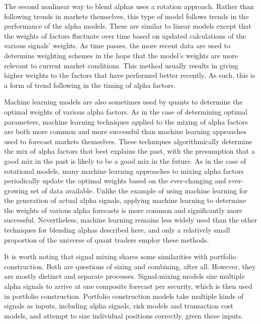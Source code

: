 \documentclass[11pt]{report}
\begin{document}
			The second nonlinear way to blend alphas uses a rotation approach. Rather than following trends in markets themselves, this type of model follows trends in the performance of the alpha models. These are similar to linear models except that the weights of factors fluctuate over time based on updated calculations of the various signals' weights. As time passes, the more recent data are used to determine weighting schemes in the hope that the model's weights are more relevant to current market conditions. This method usually results in giving higher weights to the factors that have performed better recently. As such, this is a form of trend following in the timing of alpha factors.

			Machine learning models are also sometimes used by quants to determine the optimal weights of various alpha factors. As in the case of determining optimal parameters, machine learning techniques applied to the mixing of alpha factors are both more common and more successful than machine learning approaches used to forecast markets themselves. These techniques algorithmically determine the mix of alpha factors that best explains the past, with the presumption that a good mix in the past is likely to be a good mix in the future. As in the case of rotational models, many machine learning approaches to mixing alpha factors periodically update the optimal weights based on the ever-changing and ever-growing set of data available. Unlike the example of using machine learning for the generation of actual alpha signals, applying machine learning to determine the weights of various alpha forecasts is more common and significantly more successful. Nevertheless, machine learning remains less widely used than the other techniques for blending alphas described here, and only a relatively small proportion of the universe of quant traders employ these methods.

			It is worth noting that signal mixing shares some similarities with portfolio construction. Both are questions of sizing and combining, after all. However, they are mostly distinct and separate processes. Signal-mixing models size multiple alpha signals to arrive at one composite forecast per security, which is then used in portfolio construction. Portfolio construction models take multiple kinds of signals as inputs, including alpha signals, risk models and transaction cost models, and attempt to size individual positions correctly, given these inputs.
\end{document}
